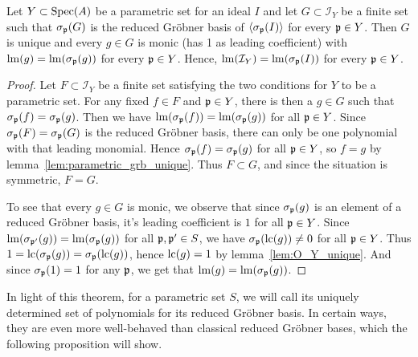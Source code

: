 \begin{theorem}\label{thm:red_grb_uniq_and_monic_and_stable}
  Let $Y \subset \operatorname{Spec}(A)$ be a parametric set for an ideal $I$ and let $G \subset \mathcal I_{Y}$ be a finite set such that $\sigma_{\mathfrak p}(G)$ is the reduced Gröbner basis of $\langle \sigma_{\mathfrak p}(I) \rangle$ for every $\mathfrak p \in Y$. Then $G$ is unique and every $g \in G$ is monic (has 1 as leading coefficient) with $\operatorname{lm}(g) = \operatorname{lm}(\sigma_{\mathfrak p}(g))$ for every $\mathfrak p \in Y$. Hence, $\operatorname{lm}(\mathcal I_{Y}) = \operatorname{lm}(\sigma_{\mathfrak p}(I))$ for every $\mathfrak p \in Y$.
\end{theorem}
\begin{proof}
  Let $F \subset \mathcal I_{Y}$ be a finite set satisfying the two conditions for $Y$ to be a parametric set. For any fixed $f \in F$ and $\mathfrak p \in Y$, there is then a $g \in G$ such that $\sigma_{\mathfrak p}(f) = \sigma_{\mathfrak p}(g)$. Then we have $\operatorname{lm}(\sigma_{\mathfrak p}(f)) = \operatorname{lm}(\sigma_{\mathfrak p}(g))$ for all $\mathfrak p \in Y$. Since $\sigma_{\mathfrak p}(F) = \sigma_{\mathfrak p}(G)$ is the reduced Gröbner basis, there can only be one polynomial with that leading monomial. Hence $\sigma_{\mathfrak p}(f) = \sigma_{\mathfrak p}(g)$ for all $\mathfrak p \in Y$, so $f = g$ by lemma~\ref{lem:parametric_grb_unique}. Thus $F \subset G$, and since the situation is symmetric, $F = G$.

  To see that every $g \in G$ is monic, we observe that since $\sigma_{\mathfrak p}(g)$ is an element of a reduced Gröbner basis, it's leading coefficient is $1$ for all $\mathfrak p \in Y$. Since $\operatorname{lm}(\sigma_{\mathfrak p'}(g)) = \operatorname{lm}(\sigma_{\mathfrak p}(g))$ for all $\mathfrak p, \mathfrak p' \in S$, we have $\sigma_{\mathfrak p}(\operatorname{lc}(g)) \neq 0$ for all $\mathfrak p \in Y$. Thus $1 = \operatorname{lc}(\sigma_{\mathfrak p}(g)) = \sigma_{\mathfrak p}(\operatorname{lc}(g))$, hence $\operatorname{lc}(g) = 1$ by lemma~\ref{lem:O_Y_unique}. And since $\sigma_{\mathfrak p}(1) = 1$ for any $\mathfrak p$, we get that $\operatorname{lm}(g) = \operatorname{lm}(\sigma_{\mathfrak p}(g))$.
\end{proof}

In light of this theorem, for a parametric set $S$, we will call its uniquely determined set of polynomials for its reduced Gröbner basis. In certain ways, they are even more well-behaved than classical reduced Gröbner bases, which the following proposition will show.

